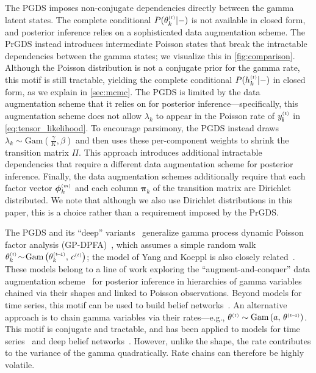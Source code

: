 \documentclass{article}
\begin{document}
The PGDS imposes non-conjugate dependencies directly between the gamma latent states. The complete conditional $P(\thetakt | -)$ is not available in closed form, and posterior inference relies on a sophisticated data augmentation scheme. The PrGDS instead introduces intermediate Poisson states that break the intractable dependencies between the gamma states; we visualize this in \cref{fig:comparison}. Although the Poisson distribution is not a conjugate prior for the gamma rate, this motif is still tractable, yielding the complete conditional $P(\hkt | -)$ in closed form, as we explain in \cref{sec:mcmc}. The PGDS is limited by the data augmentation scheme that it relies on for posterior inference---specifically, this augmentation scheme does not allow $\lambda_k$ to appear in the Poisson rate of $\ydt$ in \cref{eq:tensor_likelihood}. To encourage parsimony, the PGDS instead draws $\lambda_k \sim \textrm{Gam}(\tfrac{\gamma}{K}, \beta)$ and then uses these per-component weights to shrink the transition matrix $\Pi$. This approach introduces additional intractable dependencies that require a different data augmentation scheme for posterior inference. Finally, the data augmentation schemes additionally require that each factor vector $\boldsymbol{\phi}_k^{\mathsmaller{(m)}}$ and each column $\boldsymbol{\pi}_k$ of the transition matrix are Dirichlet distributed. We note that although we also use Dirichlet distributions in this paper, this is a choice rather than a requirement imposed by the PrGDS.~

The PGDS and its ``deep'' variants~\cite{gong2017deep,guo2018deep} generalize gamma process dynamic Poisson factor analysis (GP-DPFA)~\citep{acharya2015nonparametric}, which assumes a simple random walk $\thetakt \tsim \Gam{\theta^{\mathsmaller{(t \tm 1)}}_k,\, c^{\mathsmaller{(t)}}}$; the model of Yang and Koeppl is also closely related~\cite{yang2018dependent}. These models belong to a line of work exploring the ``augment-and-conquer'' data augmentation scheme~\cite{zhou2012augment-and-conquer} for posterior inference in hierarchies of gamma variables chained via their shapes and linked to Poisson observations. Beyond models for time series, this motif can be used to build belief networks~\cite{zhou2015poisson}. An alternative approach is to chain gamma variables via their rates---e.g., $\theta^{\mathsmaller{(t)}} \sim \Gam{a,\,\theta^{\mathsmaller{(t\tm 1)}}}$. This motif is conjugate and tractable, and has been applied to models for time series~\cite{cemgil2007conjugate,fevotte2013non,jerfel2016dynamic} and deep belief networks~\cite{ranganath2015deep}. However, unlike the shape, the rate contributes to the variance of the gamma quadratically. Rate chains can therefore be highly volatile.~
\end{document}
